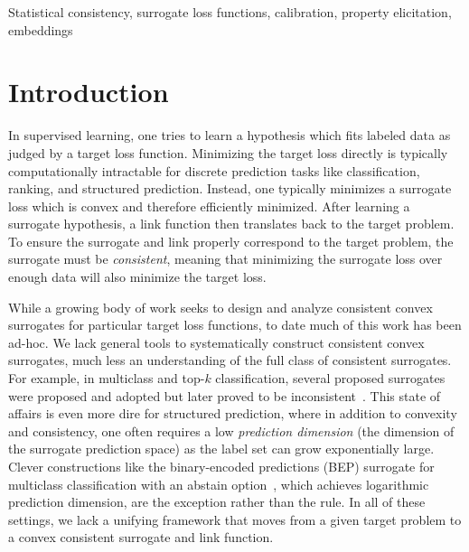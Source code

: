\documentclass[twoside,11pt]{article}
\begin{document}
\begin{keywords}%
  Statistical consistency, surrogate loss functions, calibration, property elicitation, embeddings
\end{keywords}

\section{Introduction}\label{sec:intro}


In supervised learning, one tries to learn a hypothesis which fits labeled data as judged by a target loss function.
Minimizing the target loss directly is typically computationally intractable for discrete prediction tasks like classification, ranking, and structured prediction.
Instead, one typically minimizes a surrogate loss which is convex and therefore efficiently minimized.
After learning a surrogate hypothesis, a link function then translates back to the target problem.
To ensure the surrogate and link properly correspond to the target problem, the surrogate must be \emph{consistent}, meaning that minimizing the surrogate loss over enough data will also minimize the target loss.

While a growing body of work seeks to design and analyze consistent convex surrogates for particular target loss functions, to date much of this work has been ad-hoc.
We lack general tools to systematically construct consistent convex surrogates, much less an understanding of the full class of consistent surrogates.
For example, in multiclass and top-$k$ classification, several proposed surrogates were proposed and adopted but later proved to be inconsistent~\cite{yang2018consistency,crammer2001algorithmic,rifkin2004defense}.
This state of affairs is even more dire for structured prediction, where in addition to convexity and consistency, one often requires a low \emph{prediction dimension} (the dimension of the surrogate prediction space) as the label set can grow exponentially large.
Clever constructions like the binary-encoded predictions (BEP) surrogate for multiclass classification with an abstain option~\cite{ramaswamy2018consistent}, which achieves logarithmic prediction dimension, are the exception rather than the rule.
In all of these settings, we lack a unifying framework that moves from a given target problem to a convex consistent surrogate and link function.
\end{document}

